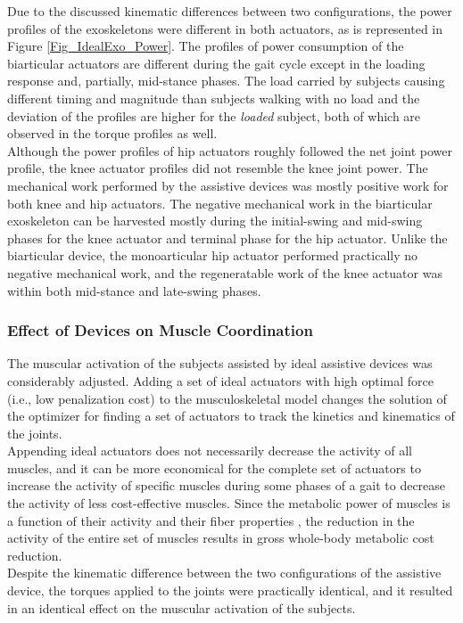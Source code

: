 \documentclass[10pt,letterpaper]{article}
\begin{document}
Due to the discussed kinematic differences between two configurations, the power profiles of the exoskeletons were different in both actuators, as is represented in Figure \ref{Fig_IdealExo_Power}. The profiles of power consumption of the biarticular actuators are different during the gait cycle except in the loading response and, partially, mid-stance phases. The load carried by subjects causing different timing and magnitude than subjects walking with no load and the deviation of the profiles are higher for the \textit{loaded} subject, both of which are observed in the torque profiles as well.\\
Although the power profiles of hip actuators roughly followed the net joint power profile, the knee actuator profiles did not resemble the knee joint power. The mechanical work performed by the assistive devices was mostly positive work for both knee and hip actuators. The negative mechanical work in the biarticular exoskeleton can be harvested mostly during the initial-swing and mid-swing phases for the knee actuator and terminal phase for the hip actuator. Unlike the biarticular device, the monoarticular hip actuator performed practically no negative mechanical work, and the regeneratable work of the knee actuator was within both mid-stance and late-swing phases.
\subsubsection*{Effect of Devices on Muscle Coordination}
The muscular activation of the subjects assisted by ideal assistive devices was considerably adjusted. Adding a set of ideal actuators with high optimal force (i.e., low penalization cost) to the musculoskeletal model changes the solution of the optimizer for finding a set of actuators to track the kinetics and kinematics of the joints.\\
Appending ideal actuators does not necessarily decrease the activity of all muscles, and it can be more economical for the complete set of actuators to increase the activity of specific muscles during some phases of a gait to decrease the activity of less cost-effective muscles. Since the metabolic power of muscles is a function of their activity and their fiber properties \cite{106}, the reduction in the activity of the entire set of muscles results in gross whole-body metabolic cost reduction.\\
Despite the kinematic difference between the two configurations of the assistive device, the torques applied to the joints were practically identical, and it resulted in an identical effect on the muscular activation of the subjects.\\
\end{document}
